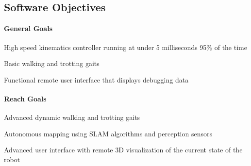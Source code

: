 \subsection*{Software Objectives}
\paragraph*{General Goals}
\begin{Deliverables}
    \item High speed kinematics controller running at under 5 milliseconds 95\% of the time
    \item Basic walking and trotting gaits
    \item Functional remote user interface that displays debugging data
\end{Deliverables}
\paragraph*{Reach Goals}
\begin{Deliverables}
    \item Advanced dynamic walking and trotting gaits
    \item Autonomous mapping using SLAM algorithms and perception sensors
    \item Advanced user interface with remote 3D visualization of the current state of the robot
\end{Deliverables}



